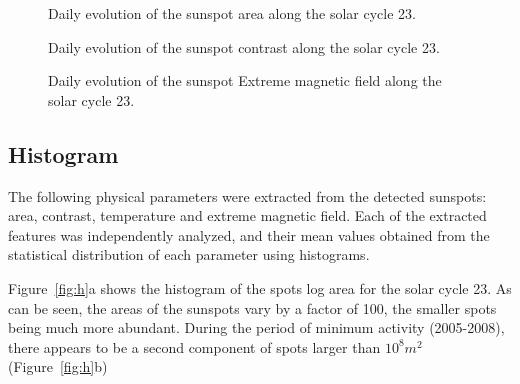 \documentclass[namedreferences]{solarphysics}
\begin{document}
\begin{article}
\begin{figure}[!htbp]
\begin{tikzpicture}

\end{tikzpicture}
\caption{Daily evolution of the sunspot area along the solar cycle 23.}
\label{fig:c23a}
\end{figure}

\begin{figure}[!htbp]
\begin{tikzpicture}

\end{tikzpicture}
\caption{Daily evolution of the sunspot contrast along the solar cycle 23.}
\label{fig:c23c}
\end{figure}

\begin{figure}[!htbp]
\begin{tikzpicture}

\end{tikzpicture}
\caption{Daily evolution of the sunspot Extreme magnetic field along the solar cycle 23.}
\label{fig:c23b}
\end{figure}

\subsection{Histogram} %
  \label{S-hist}
The following physical parameters were extracted from the detected sunspots: area, contrast, temperature and extreme magnetic field. 
Each of the extracted features was independently analyzed, and their mean values obtained from the statistical distribution of each parameter using histograms.

Figure~\ref{fig:h}a shows the histogram of the spots log area for the solar cycle 23.
As can be seen, the areas of the sunspots vary by a factor of 100, the smaller spots being much more abundant.
During the period of minimum activity (2005-2008), there appears to be a second component of spots larger than $10^8 m^2$ (Figure~\ref{fig:h}b)


\end{article}
\end{document}
